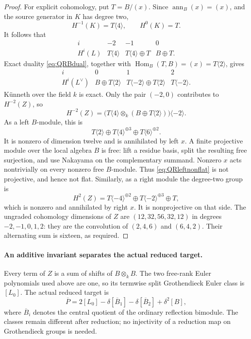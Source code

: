 \begin{proof}
For explicit cohomology, put \(T=B/(x)\).
Since \(\operatorname{ann}_B(x)=(x)\), and the
source generator in \(K\) has degree two,
\[
 H^{-1}(K)=T\langle4\rangle,\qquad H^0(K)=T.
\]
It follows that
\[
\begin{array}{c|ccc}
 i&-2&-1&0\\\hline
 H^i(L)&T\langle4\rangle&
 T\langle4\rangle\oplus T&B\oplus T.
\end{array}
\]
Exact duality \eqref{eq:QRBdual}, together with
\(\operatorname{Hom}_B(T,B)=(x)=T\langle2\rangle\),
gives
\[
\begin{array}{c|ccc}
 i&0&1&2\\\hline
 H^i(L^\vee)&B\oplus T\langle2\rangle&
 T\langle-2\rangle\oplus T\langle2\rangle&
 T\langle-2\rangle.
\end{array}
\]
K\"unneth over the field \(k\) is exact.
Only the pair \((-2,0)\) contributes to
\(H^{-2}(Z)\), so
\[
 H^{-2}(Z)=
 \bigl(T\langle4\rangle\otimes_k
       (B\oplus T\langle2\rangle)\bigr)\langle-2\rangle.
\]
As a left \(B\)-module, this is
\begin{equation}\label{eq:QRleftnonflat}
 T\langle2\rangle\oplus
 T\langle4\rangle^{\oplus3}\oplus
 T\langle6\rangle^{\oplus2}.
\end{equation}
It is nonzero of dimension twelve and is annihilated
by left \(x\). A finite projective module over the
local algebra \(B\) is free: lift a residue basis,
split the resulting free surjection, and use
Nakayama on the complementary summand.
Nonzero \(x\) acts nontrivially on every nonzero
free \(B\)-module. Thus \eqref{eq:QRleftnonflat}
is not projective, and hence not flat.
Similarly, as a right module the degree-two group is
\begin{equation}\label{eq:QRrightnonflat}
 H^2(Z)=T\langle-4\rangle^{\oplus2}\oplus
        T\langle-2\rangle^{\oplus3}\oplus T,
\end{equation}
which is nonzero and annihilated by right \(x\).
It is nonprojective on that side.
The ungraded cohomology dimensions of \(Z\) are
\((12,32,56,32,12)\) in degrees \(-2,-1,0,1,2\):
they are the convolution of \((2,4,6)\) and
\((6,4,2)\). Their alternating sum is sixteen,
as required.
\end{proof}

\paragraph{An additive invariant separates the actual reduced target.}
Every term of \(Z\) is a sum of shifts of
\(B\otimes_k B\). The two free-rank Euler
polynomials used above are one, so its termwise
split Grothendieck Euler class is \([L_0]\).
The actual reduced target is
\begin{equation}\label{eq:QRtarget}
 \overline P=2[L_0]-\delta[\overline B_1]
                    -\delta[\overline B_2]+\delta^2[B],
\end{equation}
where \(\overline B_i\) denotes the central quotient
of the ordinary reflection bimodule. The classes
remain different after reduction; no injectivity
of a reduction map on Grothendieck groups is needed.

